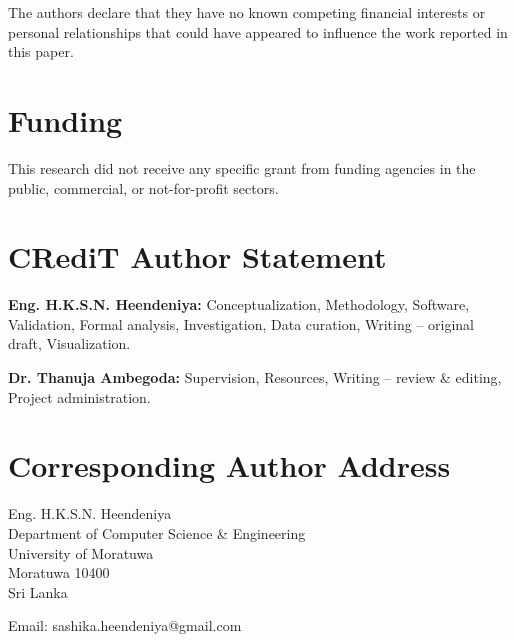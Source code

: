 \documentclass[12pt]{article}
\begin{document}
The authors declare that they have no known competing financial interests or personal relationships that could have appeared to influence the work reported in this paper.

\vspace{2em}

\section*{Funding}

This research did not receive any specific grant from funding agencies in the public, commercial, or not-for-profit sectors.

\vspace{2em}

\section*{CRediT Author Statement}

\textbf{Eng. H.K.S.N. Heendeniya:} Conceptualization, Methodology, Software, Validation, Formal analysis, Investigation, Data curation, Writing – original draft, Visualization.

\textbf{Dr. Thanuja Ambegoda:} Supervision, Resources, Writing – review \& editing, Project administration.

\vspace{2em}

\section*{Corresponding Author Address}

Eng. H.K.S.N. Heendeniya\\
Department of Computer Science \& Engineering\\
University of Moratuwa\\
Moratuwa 10400\\
Sri Lanka

\vspace{1em}

Email: sashika.heendeniya@gmail.com
\end{document}
